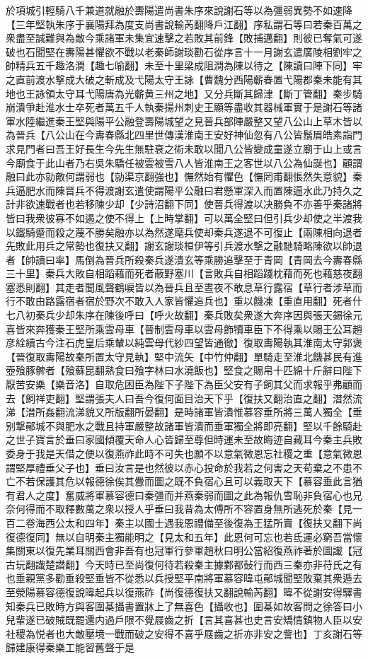 於項城引輕騎八千兼道就融於夀陽遣尚書朱序來說謝石等以為彊弱異勢不如速降【三年堅執朱序于襄陽拜為度支尚書說輸芮翻降戶江翻】序私謂石等曰若秦百萬之衆盡至誠難與為敵今乘諸軍未集宜速擊之若敗其前鋒【敗捕邁翻】則彼已奪氣可遂破也石聞堅在夀陽甚懼欲不戰以老秦師謝琰勸石從序言十一月謝玄遣廣陵相劉牢之帥精兵五千趣洛澗【趣七喻翻】未至十里梁成阻澗為陳以待之【陳讀曰陣下同】牢之直前渡水撃成大破之斬成及弋陽太守王詠【曹魏分西陽蘄春置弋陽郡秦未能有其地也王詠領太守耳弋陽唐為光蘄黄三州之地】又分兵斷其歸津【斷丁管翻】秦步騎崩潰爭赴淮水士卒死者萬五千人執秦揚州刺史王顯等盡收其器械軍實于是謝石等諸軍水陸繼進秦王堅與陽平公融登壽陽城望之見晉兵部陣嚴整又望八公山上草木皆以為晉兵【八公山在今夀春縣北四里世傳漢淮南王安好神仙忽有八公皆鬚眉皓素詣門求見門者曰吾王好長生今先生無駐衰之術未敢以聞八公皆變成童遂立廟于山上或言今廟食于此山者乃右吳朱驕任被雲被雪八人皆淮南王之客世以八公為仙誕也】顧謂融曰此亦勍敵何謂弱也【勍渠京翻強也】憮然始有懼色【憮罔甫翻悵然失意貌】秦兵逼肥水而陳晋兵不得渡謝玄遣使謂陽平公融曰君懸軍深入而置陳逼水此乃持久之計非欲速戰者也若移陳少却【少詩沼翻下同】使晉兵得渡以决勝負不亦善乎秦諸將皆曰我衆彼寡不如遏之使不得上【上時掌翻】可以萬全堅曰但引兵少却使之半渡我以鐵騎蹙而殺之蔑不勝矣融亦以為然遂麾兵使却秦兵遂退不可復止【兩陳相向退者先敗此用兵之常勢也復扶又翻】謝玄謝琰桓伊等引兵渡水撃之融馳騎略陳欲以帥退者【帥讀曰率】馬倒為晉兵所殺秦兵遂潰玄等乘勝追擊至于青岡【青岡去今夀春縣三十里】秦兵大敗自相蹈藉而死者蔽野塞川【言敗兵自相蹈踐枕藉而死也藉慈夜翻塞悉則翻】其走者聞風聲鶴唳皆以為晉兵且至晝夜不敢息草行露宿【草行者涉草而行不敢由路露宿者宿於野次不敢入人家皆懼追兵也】重以饑凍【重直用翻】死者什七八初秦兵少却朱序在陳後呼曰【呼火故翻】秦兵敗矣衆遂大奔序因與張天錫徐元喜皆來奔獲秦王堅所乘雲母車【晉制雲母車以雲母飾犢車臣下不得乘以賜王公耳趙彦絟續古今注石虎皇后乘輦以純雲母代紗四望皆通徹】復取夀陽執其淮南太守郭褒【晉復取夀陽故秦所置太守見執】堅中流矢【中竹仲翻】單騎走至淮北饑甚民有進壺飱豚髀者【飱蘇昆翻熟食曰飱字林曰水澆飯也】堅食之賜帛十匹綿十斤辭曰陛下厭苦安樂【樂音洛】自取危困臣為陛下子陛下為臣父安有子飼其父而求報乎弗顧而去【飼祥吏翻】堅謂張夫人曰吾今復何面目治天下乎【復扶又翻治直之翻】澘然流涕【澘所姦翻流涕貌又所版翻所晏翻】是時諸軍皆潰惟慕容垂所將三萬人獨全【垂别撃鄖城不與肥水之戰且持軍嚴整故諸軍皆潰而垂軍獨全將即亮翻】堅以千餘騎赴之世子寶言於垂曰家國傾覆天命人心皆歸至尊但時運未至故晦迹自藏耳今秦主兵敗委身于我是天借之便以復燕祚此時不可失也願不以意氣微恩忘社稷之重【意氣微恩謂堅厚禮垂父子也】垂曰汝言是也然彼以赤心投命於我若之何害之天苟棄之不患不亡不若保護其危以報德徐俟其釁而圖之既不負宿心且可以義取天下【慕容垂此言猶有君人之度】奮威將軍慕容德曰秦彊而并燕秦弱而圖之此為報仇雪恥非負宿心也兄奈何得而不取釋數萬之衆以授人乎垂曰我昔為太傅所不容置身無所逃死於秦【見一百二卷海西公太和四年】秦主以國士遇我恩禮備至後復為王猛所賣【復扶又翻下尚復德復同】無以自明秦主獨能明之【見太和五年】此恩何可忘也若氐運必窮吾當懷集關東以復先業耳關西會非吾有也冠軍行參軍趙秋曰明公當紹復燕祚著於圖䜟【冠古玩翻䜟楚譛翻】今天時已至尚復何待若殺秦主據鄴都鼔行而西三秦亦非苻氏之有也垂親黨多勸垂殺堅垂皆不從悉以兵授堅平南將軍慕容暐屯鄖城聞堅敗棄其衆遁去至滎陽慕容德復說暐起兵以復燕祚【尚復德復扶又翻說輸芮翻】暐不從謝安得驛書知秦兵已敗時方與客圍棊攝書置牀上了無喜色【攝收也】圍棊如故客問之徐答曰小兒輩遂已破賊既罷還内過戶限不覺屐齒之折【言其喜甚也史言安矯情鎮物人臣以安社稷為悦者也大敵壓境一戰而破之安得不喜乎屐齒之折亦非安之訾也】丁亥謝石等歸建康得秦樂工能習舊聲于是